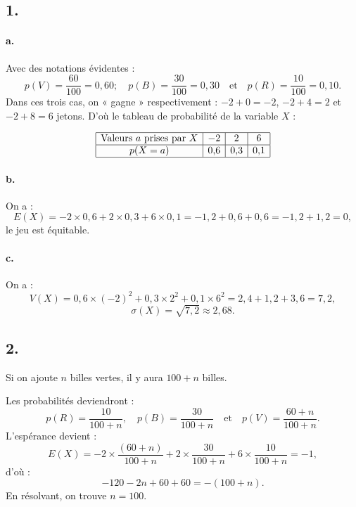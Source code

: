 \subsection*{1.}

\paragraph{a.} Avec des notations évidentes :
\[
p(V) = \dfrac{60}{100} = 0{,}60 ; \quad p(B) = \dfrac{30}{100} = 0{,}30 \quad \text{et} \quad p(R) = \dfrac{10}{100} = 0{,}10.
\]
Dans ces trois cas, on « gagne » respectivement : \( -2 + 0 = -2 \), \( -2 + 4 = 2 \) et \( -2 + 8 = 6 \) jetons. D'où le tableau de probabilité de la variable \( X \) :

\[
\begin{array}{|c|c|c|c|}
\hline
\text{Valeurs } a \text{ prises par } X & -2 & 2 & 6 \\
\hline
p(X = a) & 0{,}6 & 0{,}3 & 0{,}1 \\
\hline
\end{array}
\]

\paragraph{b.} On a :
\[
E(X) = -2 \times 0{,}6 + 2 \times 0{,}3 + 6 \times 0{,}1 = -1{,}2 + 0{,}6 + 0{,}6 = -1{,}2 + 1{,}2 = 0,
\]
le jeu est équitable.

\paragraph{c.} On a :
\[
V(X) = 0{,}6 \times (-2)^2 + 0{,}3 \times 2^2 + 0{,}1 \times 6^2 = 2{,}4 + 1{,}2 + 3{,}6 = 7{,}2,
\]
\[
\sigma(X) = \sqrt{7{,}2} \approx 2{,}68.
\]

\subsection*{2.}

Si on ajoute \( n \) billes vertes, il y aura \( 100 + n \) billes.

Les probabilités deviendront :
\[
p(R) = \dfrac{10}{100 + n}, \quad p(B) = \dfrac{30}{100 + n} \quad \text{et} \quad p(V) = \dfrac{60 + n}{100 + n}.
\]
L'espérance devient :
\[
E(X) = -2 \times \dfrac{(60 + n)}{100 + n} + 2 \times \dfrac{30}{100 + n} + 6 \times \dfrac{10}{100 + n} = -1,
\]
d'où :
\[
-120 - 2n + 60 + 60 = -(100 + n).
\]
En résolvant, on trouve \( n = 100 \).
